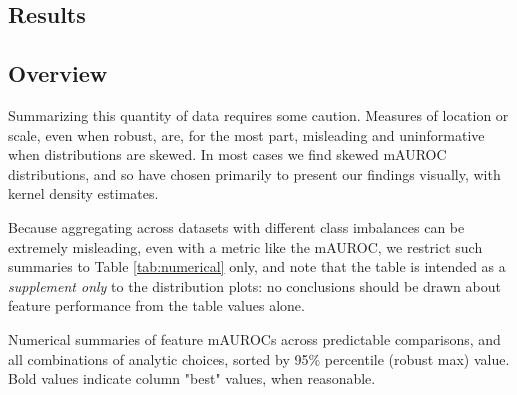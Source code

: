 \documentclass[12pt]{spieman}  %
\begin{document}
\begin{spacing}{2}
\section{Results}
\label{sec:results}

\subsection{Overview}

Summarizing this quantity of data requires some caution. Measures of location or
scale, even when robust, are, for the most part, misleading and uninformative
when distributions are skewed. In most cases we find skewed mAUROC
distributions, and so have chosen primarily to present our findings visually,
with kernel density estimates.

Because aggregating across datasets with different class imbalances can
be extremely misleading, even with a metric like the mAUROC\cite{brabecModelEvaluationNonconstant2020},
we restrict such summaries to Table \ref{tab:numerical} only, and note that
the table is intended as a \textit{supplement only} to the distribution plots: no conclusions
should be drawn about feature performance from the table values alone.

\begin{table}[h!]
\caption{Numerical summaries of feature mAUROCs across predictable comparisons,
and all combinations of analytic choices, sorted by 95\% percentile (robust
max) value. Bold values indicate column "best" values, when reasonable.}
\label{tab:numerical}
\small
\centering


\end{table}
\end{spacing}
\end{document}
